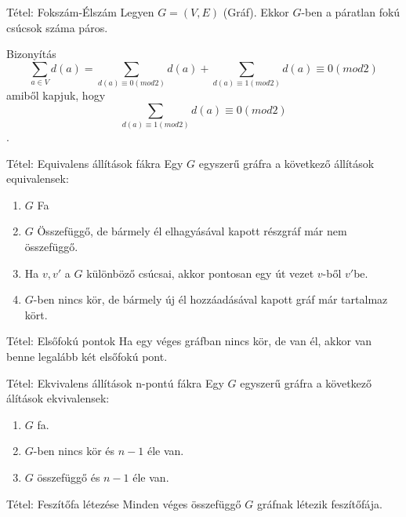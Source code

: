 \documentclass{beamer}
\begin{document}
\begin{frame}

\begin{block}{Tétel: Fokszám-Élszám}
Legyen $G = (V, E)$ (Gráf). Ekkor $G$-ben a páratlan fokú csúcsok száma páros.

\end{block}

\begin{block}{Bizonyítás}
$$\sum_{a \in V} d(a) = \sum_{d(a) \equiv 0 (mod 2)} d(a) + \sum_{d(a) \equiv 1 (mod 2)} d(a) \equiv 0 (mod 2)$$
amiből kapjuk, hogy $$\sum_{d(a) \equiv 1 (mod 2)} d(a) \equiv 0 (mod 2)$$.

\end{block}

\end{frame}

\begin{frame}

\begin{block}{Tétel: Equivalens állítások fákra}
Egy $G$ egyszerű gráfra a következő állítások equivalensek:

\begin{enumerate}
\item $G$ Fa
\item $G$ Összefüggő, de bármely él elhagyásával kapott részgráf már nem összefüggő.
\item Ha $v, v'$ a $G$ különböző csúcsai, akkor pontosan egy út vezet $v$-ből $v'$be.
\item $G$-ben nincs kör, de bármely új él hozzáadásával kapott gráf már tartalmaz kört.
\end{enumerate}

\end{block}


\begin{block}{Tétel: Elsőfokú pontok}
Ha egy véges gráfban nincs kör, de van él, akkor van benne legalább két elsőfokú pont.

\end{block}

\end{frame}

\begin{frame} 

\begin{block}{Tétel: Ekvivalens állítások n-pontú fákra}
Egy $G$ egyszerű gráfra a következő álítások ekvivalensek:

\begin{enumerate}
\item $G$ fa.
\item $G$-ben nincs kör és $n - 1$ éle van.
\item $G$ összefüggő és $n - 1$ éle van.
\end{enumerate}

\end{block}

\begin{block}{Tétel: Feszítőfa létezése}
Minden véges összefüggő $G$ gráfnak létezik feszítőfája.

\end{block}

\end{frame}
\end{document}
